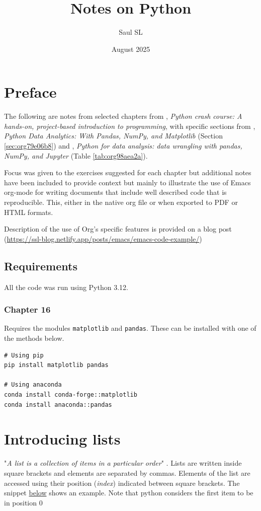\documentclass[10pt]{book}
\author{Saul SL}
\date{August 2025}
\title{Notes on Python}
\begin{document}
\maketitle
\tableofcontents

\chapter{Preface}
\label{sec:orgad82661}
The following are notes from selected chapters from \citeauthor{Matthes-2019}, \emph{Python crash course: A hands-on, project-based introduction to programming}, with specific sections from \citeauthor{Nelli-2023}, \emph{Python Data Analytics: With Pandas, NumPy, and Matplotlib} (Section \ref{sec:org79e06b8}) and \citeauthor{McKinney-2022},  \emph{Python for data analysis: data wrangling with pandas, NumPy, and Jupyter} (Table \ref{tab:org98aea2a}).

Focus was given to the exercises suggested for each chapter but additional notes have been included to provide context but mainly to illustrate the use of Emacs org-mode for writing documents that include well described code that is reproducible. This, either in the native org file or when exported to PDF or HTML formats.

Description of the use of Org's specific features is provided on a blog post (\url{https://ssl-blog.netlify.app/posts/emacs/emacs-code-example/})
\section{Requirements}
\label{sec:org5bfac72}
All the code was run using Python 3.12.
\subsection{Chapter 16}
\label{sec:orgc505b6a}
Requires the modules \texttt{matplotlib} and \texttt{pandas}. These can be installed with one of the methods below.
\begin{verbatim}
# Using pip
pip install matplotlib pandas

# Using anaconda
conda install conda-forge::matplotlib
conda install anaconda::pandas
\end{verbatim}

\setcounter{chapter}{2}
\chapter{Introducing lists}
\label{sec:orgb3ee98a}
"\emph{A list is a collection of items in a particular order}" \parencite{Matthes-2019}. Lists are written inside square brackets and elements are separated by commas.
Elements of the list are accessed using their position (\emph{index}) indicated between square brackets. The snippet \hyperref[orgc30a3f7]{below} shows an example. Note that python considers the first item to be in position 0
\end{document}
